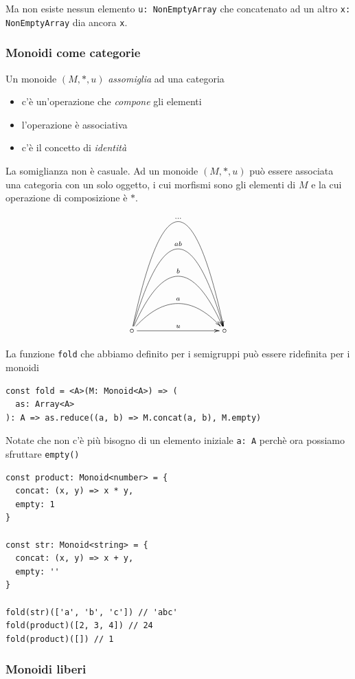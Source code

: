 \documentclass[12pt]{article}
\begin{document}
Ma non esiste nessun elemento \texttt{u: NonEmptyArray} che concatenato ad un altro \texttt{x: NonEmptyArray} dia ancora \texttt{x}.

\subsubsection{Monoidi come categorie}

Un monoide $(M, *, u)$ \emph{assomiglia} ad una categoria

\begin{itemize}
  \item c'è un'operazione che \emph{compone} gli elementi
  \item l'operazione è associativa
  \item c'è il concetto di \emph{identità}
\end{itemize}

La somiglianza non è casuale. Ad un monoide $(M, *, u)$ può essere associata una categoria con un solo oggetto,
i cui morfismi sono gli elementi di $M$ e la cui operazione di composizione è $*$.

\[
\xymatrixrowsep{3cm}
\xymatrixcolsep{3cm}
\xymatrix{
  \circ \ar[r]^u \ar@/^1cm/[r]^a \ar@/^2cm/[r]^b \ar@/^3cm/[r]^{ab} \ar@/^4cm/[r]^{\ldots} & \circ
}
\]

La funzione \texttt{fold} che abbiamo definito per i semigruppi può essere ridefinita per i monoidi

\begin{verbatim}
const fold = <A>(M: Monoid<A>) => (
  as: Array<A>
): A => as.reduce((a, b) => M.concat(a, b), M.empty)
\end{verbatim}

Notate che non c'è più bisogno di un elemento iniziale \texttt{a: A} perchè ora possiamo sfruttare \texttt{empty()}

\begin{verbatim}
const product: Monoid<number> = {
  concat: (x, y) => x * y,
  empty: 1
}

const str: Monoid<string> = {
  concat: (x, y) => x + y,
  empty: ''
}

fold(str)(['a', 'b', 'c']) // 'abc'
fold(product)([2, 3, 4]) // 24
fold(product)([]) // 1
\end{verbatim}

\subsubsection{Monoidi liberi}
\end{document}
